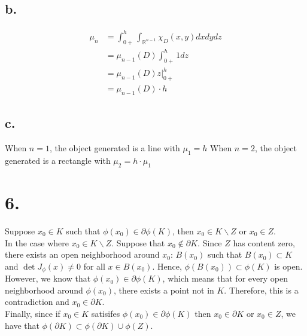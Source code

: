 \documentclass[11pt]{article}
\begin{document}
\subsection*{b.}
\begin{equation*}
    \begin{aligned}
        \mu_n 
        &= \int_{0+}^h \int_{\mathbb{R}^{n-1}} \chi_D  \left(x, y \right) dxdydz \\
        &= \mu_{n-1}(D) \int_{0+}^h 1 dz \\
        &= \mu_{n-1}(D) \left.z \right|_{0+}^{h} \\
        &= \mu_{n-1}(D) \cdot h
    \end{aligned}
\end{equation*}
\subsection*{c.}
When $n=1$, the object generated is a line with $\mu_1 = h$
When $n=2$, the object generated is a rectangle with $\mu_2 = h \cdot \mu_1$
\pagebreak
\section*{6.}
Suppose $x_0 \in K$ such that $\phi(x_0) \in \partial \phi(K)$, then $x_0 \in K\backslash Z$ or $x_0 \in Z$. \\
In the case where $x_0 \in K\backslash Z$. Suppose that $x_0 \notin \partial K$. 
Since $Z$ has content zero, 
there exists an open neighborhood around $x_0$: $B(x_0)$ such that $B(x_0) \subset K$ and $\det J_\phi(x) \ne 0$ for all $x \in B(x_0)$.
Hence, $\phi(B(x_0)) \subset \phi(K)$ is open. \\
However, we know that $\phi(x_0) \in \partial \phi(K)$, 
which means that for every open neighborhood around $\phi(x_0)$, there exists a point not in $K$. 
Therefore, this is a contradiction and $x_0 \in \partial K$. \\
Finally, since if $x_0 \in K$ satisifes $\phi(x_0) \in \partial \phi(K)$ then $x_0 \in \partial K$ or $x_0 \in Z$, 
we have that $\phi(\partial K) \subset \phi(\partial K) \cup \phi(Z)$.
\end{document}
